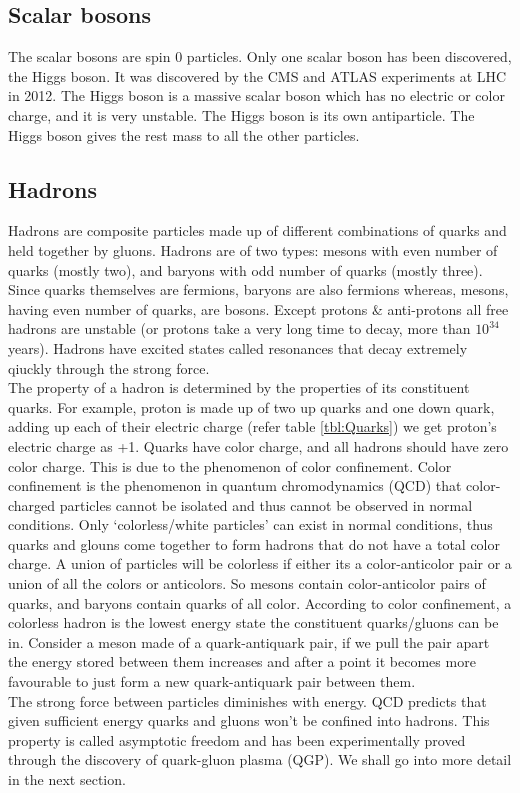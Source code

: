 \documentclass[12pt,a4paper,twoside]{report}
\begin{document}
\subsection{Scalar bosons}
The scalar bosons are spin 0 particles. Only one scalar boson has been discovered, the Higgs boson. It was discovered by the CMS and ATLAS experiments at LHC in 2012.\cite{Ref:higgs-ATLAS}\cite{Ref:higgs-CMS} The Higgs boson is a massive scalar boson which has no electric or color charge, and it is very unstable. The Higgs boson is its own antiparticle. The Higgs boson gives the rest mass to all the other particles.
\subsection{Hadrons}
Hadrons are composite particles made up of different combinations of quarks and held together by gluons. Hadrons are of two types: mesons with even number of quarks (mostly two), and baryons with odd number of quarks (mostly three). Since quarks themselves are fermions, baryons are also fermions whereas, mesons, having even number of quarks, are bosons. Except protons \& anti-protons all free hadrons are unstable (or protons take a very long time to decay, more than $10^{34}$ years). Hadrons have excited states called resonances that decay extremely qiuckly through the strong force.\\
The property of a hadron is determined by the properties of its constituent quarks. For example, proton is made up of two up quarks and one down quark, adding up each of their electric charge (refer table \ref{tbl:Quarks}) we get proton's electric charge as +1. Quarks have color charge, and all hadrons should have zero color charge. This is due to the phenomenon of color confinement. Color confinement is the phenomenon in quantum chromodynamics (QCD) that color-charged particles cannot be isolated and thus cannot be observed in normal conditions. Only `colorless/white particles' can exist in normal conditions, thus quarks and glouns come together to form hadrons that do not have a total color charge. A union of particles will be colorless if either its a color-anticolor pair or a union of all the colors or anticolors. So mesons contain color-anticolor pairs of quarks, and baryons contain quarks of all color. According to color confinement, a colorless hadron is the lowest energy state the constituent quarks/gluons can be in. Consider a meson made of a quark-antiquark pair, if we pull the pair apart the energy stored between them increases and after a point it becomes more favourable to just form a new quark-antiquark pair between them.\\
The strong force between particles diminishes with energy. QCD predicts that given sufficient energy quarks and gluons won't be confined into hadrons. This property is called asymptotic freedom and has been experimentally proved through the discovery of quark-gluon plasma (QGP). We shall go into more detail in the next section.\\
 
\end{document}
